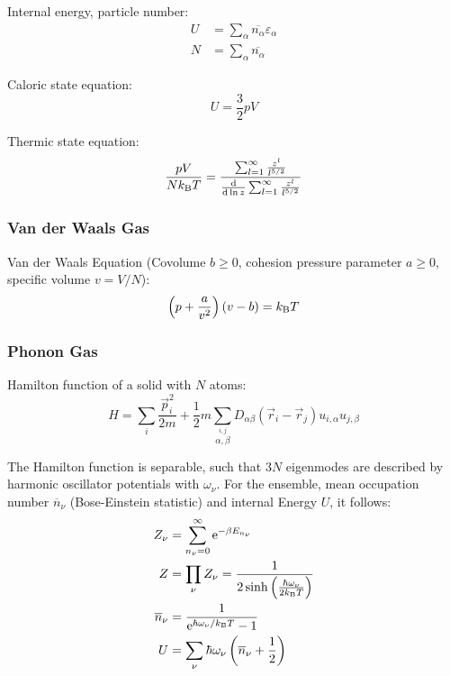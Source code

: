 			\noindent
			Internal energy, particle number:
			\begin{equation}
				\begin{aligned}
					U &= \sum_\alpha \overline{n_\alpha} \varepsilon_\alpha \\
					N &= \sum_\alpha \overline{n_\alpha}
				\end{aligned}
			\end{equation}

			\noindent
			Caloric state equation:
			\begin{equation}
				U=\frac{3}{2}pV
			\end{equation}

			\noindent
			Thermic state equation:
			\begin{equation}
				\frac{pV}{N k_{\text{B}} T} = \frac{\sum_{l=1}^{\infty}\frac{z^l}{l^{5/2}}}{\dv{\ln z}\sum_{l=1}^{\infty}\frac{z^l}{l^{5/2}}}
			\end{equation}

		\subsubsection{Van der Waals Gas}
			\noindent
			Van der Waals Equation (Covolume $b \ge 0$, cohesion pressure parameter $a \ge 0$, specific volume $v=V/N$):
			\begin{equation}
				\left( p+\frac{a}{v^2} \right) \left( v-b \right) = k_{\text{B}} T
			\end{equation}

		\subsubsection{Phonon Gas}
			\label{Sec:PhononGas}
			\noindent
			Hamilton function of a solid with $N$ atoms:
			\begin{equation}
				H=\sum_i \frac{\vec{p}_i^2}{2m} + \frac{1}{2}m\sum_{\stackrel{i,j}{\alpha,\beta}} D_{\alpha\beta}(\vec{r}_i - \vec{r}_j)u_{i,\alpha}u_{j,\beta}
			\end{equation}

			\noindent
			The Hamilton function is separable, such that $3N$ eigenmodes are described by harmonic oscillator potentials with $\omega_\nu$. For the ensemble, mean occupation number $\overline{n}_\nu$ (Bose-Einstein statistic) and internal Energy $U$, it follows:
			\begin{equation}
				\begin{aligned}
					Z_\nu &= \sum_{n_\nu=0}^\infty \mathrm{e}^{-\beta E_{n_\nu}} \\
					Z &= \prod_\nu Z_\nu = \frac{1}{2\sinh{\left( \frac{\hbar\omega_\nu}{2 k_{\text{B}}T} \right)}} \\
					\overline{n}_\nu &= \frac{1}{\mathrm{e}^{\hbar\omega_\nu/k_{\text{B}} T} - 1} \\
					U &= \sum_\nu \hbar\omega_\nu \left(\overline{n}_\nu + \frac{1}{2}\right)
				\end{aligned}
			\end{equation}


